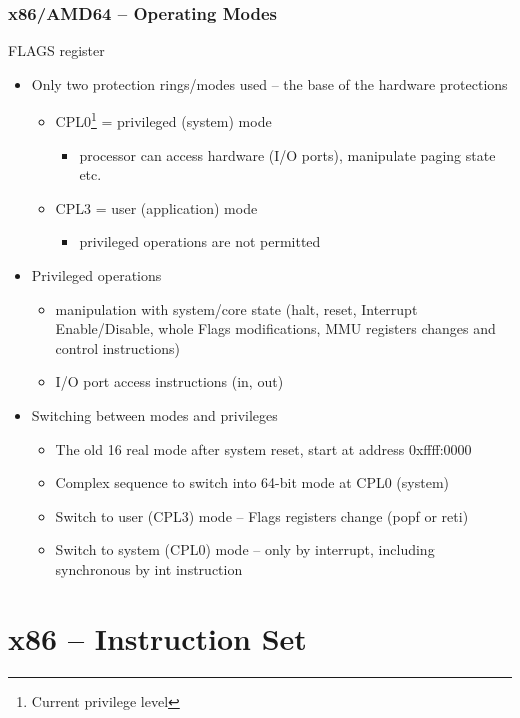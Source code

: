 \documentclass{beamer}
\begin{document}
\begin{frame}
\frametitle{x86/AMD64 -- Operating Modes}
FLAGS register 
\begin{itemize}
  \item Only two protection rings/modes used -- the base of the hardware protections
  \begin{itemize}
    \item CPL0\footnote{Current privilege level} =  privileged (system) mode
    \begin{itemize}
      \item processor can access hardware (I/O ports), manipulate paging state etc. 
    \end{itemize}
    \item CPL3 = user (application) mode
    \begin{itemize}
      \item privileged operations are not permitted
    \end{itemize}
  \end{itemize}
  \item Privileged operations
  \begin{itemize}
    \item manipulation with system/core state (halt, reset, Interrupt Enable/Disable, whole Flags modifications, MMU registers changes and control instructions) 
    \item I/O port access instructions (in, out)
  \end{itemize}

  \item Switching between modes and privileges
  \begin{itemize}
    \item The old 16 real mode after system reset, start at address 0xffff:0000
    \item Complex sequence to switch into 64-bit mode at CPL0 (system)
    \item Switch to user (CPL3) mode -- Flags registers change (popf or reti)
    \item Switch to system (CPL0) mode -- only by interrupt, including synchronous by int instruction
  \end{itemize}
\end{itemize}
\end{frame}


\section{x86 -- Instruction Set}
\end{document}
